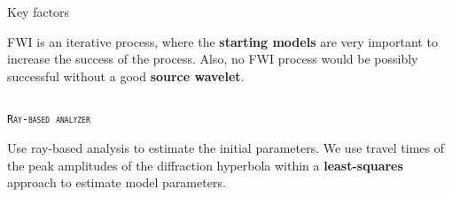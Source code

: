 \documentclass[final]{beamer}
\newlength{\onecolwid}
\newlength{\twocolwid}
\begin{document}
\begin{frame}[t]
\begin{columns}[t]
\begin{column}{\twocolwid}
\begin{columns}[t,totalwidth=\twocolwid]
\begin{column}{\onecolwid}

\end{column} %

\end{columns} %


\begin{alertblock}{Key factors}

FWI is an iterative process, where the \textbf{starting models} are very important to increase the success of the process. Also, no FWI process would be possibly successful without a good \textbf{source wavelet}.

\end{alertblock} 


\begin{columns}[t,totalwidth=\twocolwid] %

\begin{column}{\onecolwid} %


\begin{block}{\textsc{\texttt{Ray-based analyzer}}}

Use ray-based analysis to estimate the initial parameters. We use travel times of the peak amplitudes of the diffraction hyperbola within a \textbf{least-squares} approach to estimate model parameters.  


\end{block}
\end{column}
\end{columns}
\end{column}
\end{columns}
\end{frame}
\end{document}
